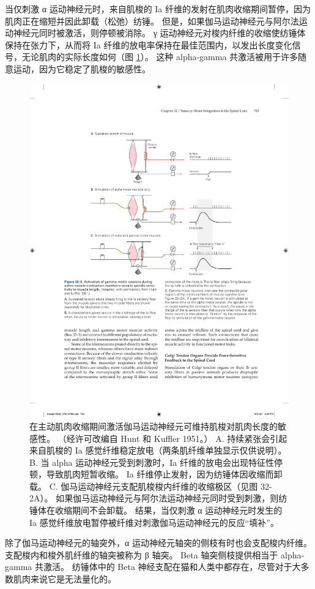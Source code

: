 当仅刺激 α 运动神经元时，来自肌梭的 Ia 纤维的发射在肌肉收缩期间暂停，因为肌肉正在缩短并因此卸载（松弛）纺锤。
但是，如果伽马运动神经元与阿尔法运动神经元同时被激活，则停顿被消除。
γ 运动神经元对梭内纤维的收缩使纺锤体保持在张力下，从而将 Ia 纤维的放电率保持在最佳范围内，以发出长度变化信号，无论肌肉的实际长度如何（图 \ref{fig:32_5}）。 
这种 alpha-gamma 共激活被用于许多随意运动，因为它稳定了肌梭的敏感性。


\begin{figure}[htbp]
	\centering
	\includegraphics[width=0.75\linewidth]{chap32/fig_32_5}
	\caption{在主动肌肉收缩期间激活伽马运动神经元可维持肌梭对肌肉长度的敏感性。 （经许可改编自 Hunt 和 Kuffler 1951。） A. 持续紧张会引起来自肌梭的 Ia 感觉纤维稳定放电（两条肌纤维单独显示仅供说明）。 B. 当 alpha 运动神经元受到刺激时，Ia 纤维的放电会出现特征性停顿，导致肌肉短暂收缩。 Ia 纤维停止发射，因为纺锤体因收缩而卸载。 C. 伽马运动神经元支配肌梭梭内纤维的收缩极区（见图 32-2A）。 如果伽马运动神经元与阿尔法运动神经元同时受到刺激，则纺锤体在收缩期间不会卸载。 结果，当仅刺激 α 运动神经元时发生的 Ia 感觉纤维放电暂停被纤维对刺激伽马运动神经元的反应“填补”。}
	\label{fig:32_5}
\end{figure}


除了伽马运动神经元的轴突外，α 运动神经元轴突的侧枝有时也会支配梭内纤维。 
支配梭内和梭外肌纤维的轴突被称为 β 轴突。
Beta 轴突侧枝提供相当于 alpha-gamma 共激活。
纺锤体中的 Beta 神经支配在猫和人类中都存在，尽管对于大多数肌肉来说它是无法量化的。


